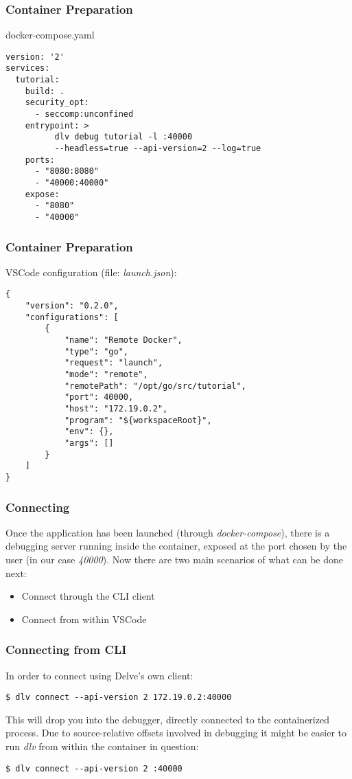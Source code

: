 \documentclass[pdf,xcolor=dvipsnames,noparindent]{beamer}
\begin{document}
\begin{frame}[fragile]
  \frametitle{Container Preparation}
  docker-compose.yaml
\begin{lstlisting}
version: '2'
services:
  tutorial:
    build: .
    security_opt:
      - seccomp:unconfined
    entrypoint: >
          dlv debug tutorial -l :40000 
          --headless=true --api-version=2 --log=true
    ports:
      - "8080:8080"
      - "40000:40000"
    expose:
      - "8080"
      - "40000"
\end{lstlisting}
\end{frame}

\begin{frame}[fragile]
  \frametitle{Container Preparation}
  VSCode configuration (file: \emph{launch.json}):
\begin{lstlisting}[]
{
    "version": "0.2.0",
    "configurations": [
        {
            "name": "Remote Docker",
            "type": "go",
            "request": "launch",
            "mode": "remote",
            "remotePath": "/opt/go/src/tutorial",
            "port": 40000,
            "host": "172.19.0.2",
            "program": "${workspaceRoot}",
            "env": {},
            "args": []
        }
    ]
}
\end{lstlisting}
\end{frame}

\begin{frame}
  \frametitle{Connecting}
  Once the application has been launched (through
  \emph{docker-compose}), there is a debugging server running inside
  the container, exposed at the port chosen by the user (in our case
  \emph{40000}).
  \newline
  \newline
  \pause
  Now there are two main scenarios of what can be done next:
  \pause
  \begin{itemize}
  \item Connect through the CLI client
    \pause
  \item Connect from within VSCode
  \end{itemize}
\end{frame}

\begin{frame}
  \frametitle{Connecting from CLI}
  In order to connect using Delve's own client:
\begin{verbatim}
$ dlv connect --api-version 2 172.19.0.2:40000
\end{verbatim}
  \pause This will drop you into the debugger, directly connected to
  the containerized process.
  \pause
  \newline
  Due to source-relative offsets involved in debugging it might be easier to run \emph{dlv} from within the container in question:
\begin{verbatim}
$ dlv connect --api-version 2 :40000
\end{verbatim}
\end{frame}
\end{document}

